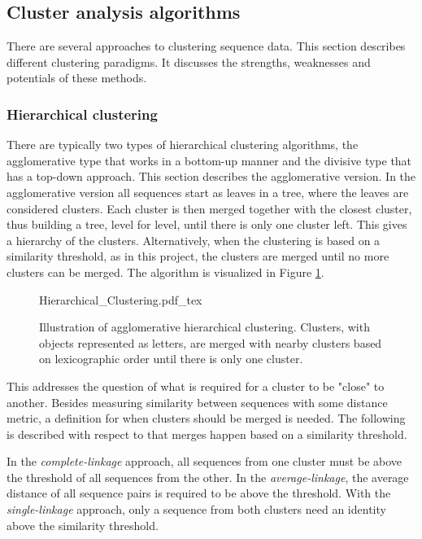 \subsection{Cluster analysis algorithms}

There are several approaches to clustering sequence data. This section
describes different clustering paradigms. It discusses the strengths,
weaknesses and potentials of these methods.

\subsubsection{Hierarchical clustering}

There are typically two types of hierarchical clustering algorithms, the
agglomerative type that works in a bottom-up manner and the divisive type that
has a top-down approach. This section describes the agglomerative version. In
the agglomerative version all sequences start as leaves in a tree, where the
leaves are considered clusters. Each cluster is then merged together with the
closest cluster, thus building a tree, level for level, until there is only one
cluster left. This gives a hierarchy of the clusters. Alternatively, when the
clustering is based on a similarity threshold, as in this project, the clusters
are merged until no more clusters can be merged. The algorithm is visualized in
Figure \ref{fig:hierarchical_clustering}.

\begin{figure}[h!]
  \centering
  \def\svgwidth{\columnwidth}
  {Hierarchical_Clustering.pdf_tex}
  \caption{Illustration of agglomerative hierarchical clustering. Clusters,
    with objects represented as letters, are merged with nearby clusters based
    on lexicographic order until there is only one cluster.}
  \label{fig:hierarchical_clustering}
\end{figure}

This addresses the question of what is required for a cluster to be "close" to
another. Besides measuring similarity between sequences with some distance
metric, a definition for when clusters should be merged is needed. The
following is described with respect to that merges happen based on a similarity
threshold.

In the \textit{complete-linkage} approach, all sequences from one cluster must
be above the threshold of all sequences from the other. In the
\textit{average-linkage}, the average distance of all sequence pairs is
required to be above the threshold. With the \textit{single-linkage} approach,
only a sequence from both clusters need an identity above the similarity
threshold.

